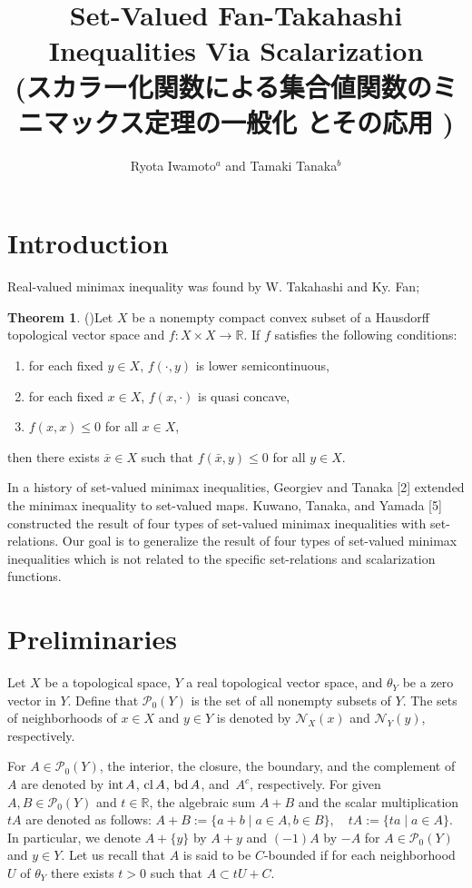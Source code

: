 \documentclass[a4paper,11pt]{jsarticle}
\title{%
Set-Valued Fan-Takahashi Inequalities Via Scalarization \\
  \large (スカラー化関数による集合値関数のミニマックス定理の一般化
  とその応用
  )}
\author{
  Ryota Iwamoto$^{a}$ and Tamaki Tanaka$^{b}$
  }
\affil{
  $^{a}$Graduate school of Science and Technology, Niigata University, \\
  $^{b}$Faculty of Science, Niigata University \\
}
\date{\vspace{-5ex}}
\theoremstyle{definition}
\newtheorem{thm}[dfn]{Theorem}
\newcommand{\rnum}{\mathbb{R}}
\newcommand{\Interior}[1]{\mbox{\rm int}\mbox{$\,#1$}}
\newcommand{\Closure}[1]{\mbox{\rm cl}\mbox{$\,#1$}}
\newcommand{\Boundary}[1]{\mbox{\rm bd}\mbox{$\,#1$}}
\newcommand{\Complement}[1]{\mbox{$\,#1^{c}$}}
\newcommand{\pow}[1]{\mathcal{P}_{0}(#1)}
\begin{document}
\maketitle
\section{\rm Introduction}
Real-valued minimax inequality was found by W. Takahashi and Ky. Fan;

\begin{thm}{(\cite{Takahashi1976})}\label{FanTakahashiMinimaxInequality}
  Let $X$ be a nonempty compact convex subset of a Hausdorff topological vector space and $f \colon X \times X \to \rnum$. If $f$ satisfies
  the following conditions:
  \begin{enumerate}
    \item for each fixed $y \in X$, $f(\cdot,y)$ is lower semicontinuous,
    \item for each fixed $x \in X$, $f(x,\cdot)$ is quasi concave,
    \item $f(x,x) \leq 0$ for all $x \in X$,
  \end{enumerate}
  then there exists $\bar{x} \in X$ such that $f(\bar{x},y) \leq 0$ for all $y \in X$.
\end{thm}

In a history of set-valued minimax inequalities,
Georgiev and Tanaka [2] extended the minimax inequality to set-valued maps.
Kuwano, Tanaka, and Yamada [5] constructed the result of four types of set-valued
minimax inequalities with set-relations.
Our goal is to generalize the result of four types of set-valued minimax
inequalities which is not related to the specific set-relations and scalarization
functions.

\section{\rm Preliminaries}

Let $X$ be a topological space,
$Y$ a real topological vector space,
and $\theta_Y$ be a zero vector in $Y$.
Define that $\pow{Y}$ is the set of all nonempty subsets of $Y$.
The sets of neighborhoods of $x \in X$ and
$y \in Y$ is denoted by $\mathcal{N}_X (x)$ and $\mathcal{N}_Y (y)$, respectively.

For $A \in \pow{Y}$, the interior, the closure, the boundary, and the complement of $A$ are denoted by
$\Interior{A}$, $\Closure{A}$, $\Boundary{A}$, and $\Complement{A}$, respectively.
For given $A,B\in\pow{Y}$ and $t\in\rnum$,
the algebraic sum $A+B$ and the scalar multiplication $tA$ are denoted as follows:
$A+B:= \{a+b \mid a\in{A},b\in{B} \}, \quad tA:= \{ta\mid a\in{A}\}$.
In particular, we denote $A+\{y\}$ by $A+y$ and
$(-1)A$ by $-A$ for $A\in\pow{Y}$ and $y\in Y$.
Let us recall that $A$ is said to be $C$-bounded if for each neighborhood $U$ of $\theta_Y$
there exists $t > 0$ such that $A \subset tU + C$.
\end{document}
